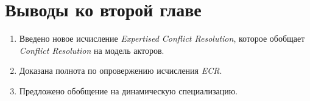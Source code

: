 \section{Выводы ко второй главе}

\begin{enumerate}
	\item Введено новое исчисление \emph{Expertised Conflict Resolution}, которое обобщает \emph{Conflict Resolution} на модель акторов.
    \item Доказана полнота по опровержению исчисления \emph{ECR}.
    \item Предложено обобщение на динамическую специализацию.
\end{enumerate}